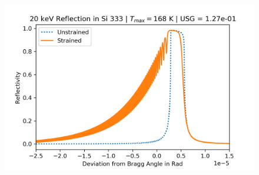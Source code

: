 \documentclass[preprint]{iucr}              %
\begin{document}
\begin{figure}
\includegraphics{images/333_20keV_8.png}
\label{fig:333usg20kev}
\end{figure}
\end{document}
